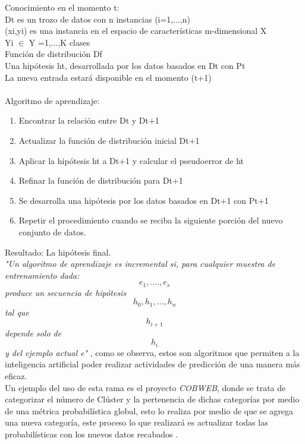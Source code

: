 			Conocimiento en el momento t: \\
			Dt es un trozo de datos con n instancias (i=1,...,n) \\
			(xi,yi) es una instancia en el espacio de características m-dimensional X\\ 
			Yi $\in$ Y ={1,...,K} clases \\
			Función de distribución Df \\
			Una hipótesis ht, desarrollada por los datos basados en Dt con Pt \\
			La nueva entrada estará disponible en el momento (t+1) \\\\
			
			Algoritmo de aprendizaje:\\
			\begin{enumerate}
				\item Encontrar la relación entre Dt y Dt+1
				\item Actualizar la función de distribución inicial Dt+1
				\item Aplicar la hipótesis ht a Dt+1 y calcular el pseudoerror de ht
				\item Refinar la función de distribución para Dt+1
				\item Se desarrolla una hipótesis por los datos basados en Dt+1 con Pt+1
				\item Repetir el procedimiento cuando se reciba la siguiente porción del nuevo conjunto de datos.
			\end{enumerate}
			Resultado: La hipótesis final.\\

      \textit{"Un algoritmo de aprendizaje es incremental si, para cualquier muestra de entrenamiento dada:
        \begin{equation*}
          e_{1} , .... , e_{s}
			  \end{equation*}
      produce un secuencia de hipótesis 
        \begin{equation*}
          h_{0} , h_{1}, . . . , h_{n} 
        \end{equation*}
      tal que \[ h_{i+1} \] depende solo de \[ h_i \] y del ejemplo actual e"} \cite{GiraudCarrier2000}, como se observa, estos son algoritmos que permiten a la inteligencia artificial poder realizar actividades de predicci\'on de una manera m\'as eficaz.\\
            
      Un ejemplo del uso de esta rama es el proyecto \textit{COBWEB}, donde se trata de categorizar el n\'umero de Cl\'uster y la pertenencia de dichas categor\'ias por medio de una m\'etrica probabil\'istica global, esto lo realiza por medio de que se agrega una nueva categor\'ia, este proceso lo que realizar\'a es actualizar todas las probabil\'isticas con los nuevos datos recabados \cite{fisher1987}.
